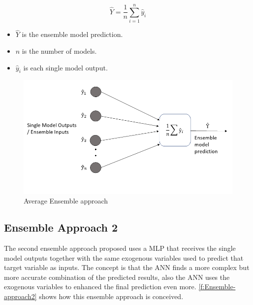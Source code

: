 \begin{equation}\label{eq:avg-ensemble}
    \hat{Y} = \frac{1}{n} \sum_{i=1}^{n}  \hat{y}_i
\end{equation}

\begin{itemize}
    \item \begin{math}\hat{Y}\end{math} is the ensemble model prediction.
    \item \begin{math}n\end{math} is the number of models.
    \item \begin{math}\hat{y}_i\end{math} is each single model output.
\end{itemize}

\begin{figure}[h]
\centering
\includegraphics[width=\linewidth]{figures/Ch4/Ensemble_Approach1.png}
\caption{Average Ensemble approach}
\label{f:Ensemble-approach1}
\end{figure}

\subsection{Ensemble Approach 2}
\label{s:Ensemble-Approach2}
The second ensemble approach proposed uses a \ac{MLP} that receives the single model outputs together with the same exogenous variables used to predict that target variable as inputs. The concept is that the \ac{ANN} finds a more complex but more accurate combination of the predicted results, also the \ac{ANN} uses the exogenous variables to enhanced the final prediction even more. \autoref{f:Ensemble-approach2} shows how this ensemble approach is conceived. 

